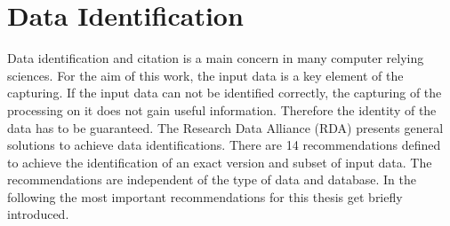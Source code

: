 \documentclass[draft,final]{vutinfth} %
\begin{document}
\section{Data Identification}\label{Data Identification}
Data identification and citation is a main concern in many computer relying sciences. For the aim of this work, the input data is a key element of the capturing. If the input data can not be identified correctly, the capturing of the processing on it does not gain useful information. Therefore the identity of the data has to be guaranteed. The Research Data Alliance (RDA) presents general solutions to achieve data identifications. There are 14 recommendations defined to achieve the identification of an exact version and subset of input data. The recommendations are independent of the type of data and database.  In the following the most important recommendations for this thesis get briefly introduced.\cite{rauber2016identification}
\end{document}
